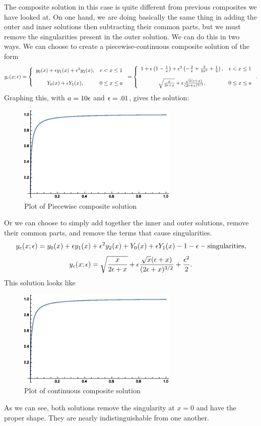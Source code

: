\item The composite solution in this case is quite different from previous composites we have looked at. On one hand, we are doing basically the same thing in adding the outer and inner solutions then subtracting their common parts, but we must remove the singularities present in the outer solution. We can do this in two ways. We can choose to create a piecewise-continuous composite solution of the form
    $$y_c(x;\epsilon)=\left\{\begin{array}{cc}y_0(x)+\epsilon y_1(x)+\epsilon^2 y_2(x),&\epsilon<x\leq1\\ \\Y_0(x)+\epsilon Y_1(x),&0\leq x\leq a\end{array}\right.=\left\{\begin{array}{cc}1+\epsilon\left(1-\frac{1}{x}\right)+\epsilon^2\left(-\frac{2}{x}+\frac{3}{2x^2}+\frac{1}{2}\right),&\epsilon<x\leq 1\\ \\ \sqrt{\frac{x}{2\epsilon+x}}+\epsilon\frac{\sqrt{x}(\epsilon+x)}{(2\epsilon+x)^{3/2}},&0\leq x\leq a\end{array}\right..$$
    Graphing this, with $a=10\epsilon$ and $\epsilon=.01$, gives the solution:
    \begin{figure}[h]
    \centering
    \includegraphics[width=3in]{test1no3prtd1}
    \caption{Plot of Piecewise composite solution}
    \end{figure}
    Or we can choose to simply add together the inner and outer solutions, remove their common parts, and remove the terms that cause singularities.
    $$y_c(x;\epsilon)=y_0(x)+\epsilon y_1(x)+\epsilon^2 y_2(x)+ Y_0(x)+\epsilon Y_1(x)-1-\epsilon-\text{singularities},$$
    $$y_c(x;\epsilon)=\sqrt{\frac{x}{2\epsilon+x}}+\epsilon\frac{\sqrt{x}(\epsilon+x)}{(2\epsilon+x)^{3/2}}+\frac{\epsilon^2}{2}.$$
    This solution looks like
    \begin{figure}[h]
    \centering
    \includegraphics[width=3in]{test1no3prtd2}
    \caption{Plot of continuous composite solution}
    \end{figure}
    As we can see, both solutions remove the singularity at $x=0$ and have the proper shape. They are nearly indistinguishable from one another.

\eenum
\eenum
